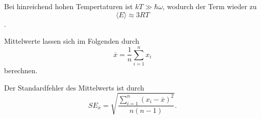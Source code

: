 Bei hinreichend hohen Tempertaturen ist $k T \gg \hbar \omega$, wodurch der Term wieder zu 
\begin{equation}
    \langle E \rangle \approx 3 R T
\end{equation}.


Mittelwerte lassen sich im Folgenden durch 
\begin{equation}
    \overline{x} = \frac{1}n \sum_{i=1}^n x_i
\end{equation}
berechnen. 

Der Standardfehler des Mittelwerts ist durch 
\begin{equation}
    SE_{\overline{x}} = \sqrt{\frac{\sum_{i=1}^n(x_i - \overline{x})^2}{n(n-1)}}.
\end{equation}



